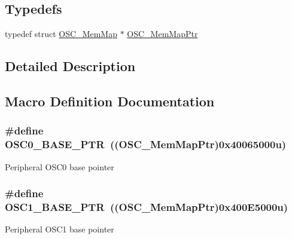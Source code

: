 \subsection*{Typedefs}
\begin{DoxyCompactItemize}
\item 
typedef struct \hyperlink{struct_o_s_c___mem_map}{O\+S\+C\+\_\+\+Mem\+Map} $\ast$ \hyperlink{group___o_s_c___peripheral_gaaa685163f549fdf24c28ec9b400310b5}{O\+S\+C\+\_\+\+Mem\+Map\+Ptr}
\end{DoxyCompactItemize}


\subsection{Detailed Description}


\subsection{Macro Definition Documentation}
\hypertarget{group___o_s_c___peripheral_gaab1618c69a91b2e5d3385139b5b566f0}{}
\subsubsection[{O\+S\+C0\+\_\+\+B\+A\+S\+E\+\_\+\+P\+T\+R}]{\setlength{\rightskip}{0pt plus 5cm}\#define O\+S\+C0\+\_\+\+B\+A\+S\+E\+\_\+\+P\+T\+R~(({\bf O\+S\+C\+\_\+\+Mem\+Map\+Ptr})0x40065000u)}\label{group___o_s_c___peripheral_gaab1618c69a91b2e5d3385139b5b566f0}
Peripheral O\+S\+C0 base pointer \hypertarget{group___o_s_c___peripheral_ga5a0e46e15931232a6e0cafb7315041fa}{}
\subsubsection[{O\+S\+C1\+\_\+\+B\+A\+S\+E\+\_\+\+P\+T\+R}]{\setlength{\rightskip}{0pt plus 5cm}\#define O\+S\+C1\+\_\+\+B\+A\+S\+E\+\_\+\+P\+T\+R~(({\bf O\+S\+C\+\_\+\+Mem\+Map\+Ptr})0x400\+E5000u)}\label{group___o_s_c___peripheral_ga5a0e46e15931232a6e0cafb7315041fa}
Peripheral O\+S\+C1 base pointer \hypertarget{group___o_s_c___peripheral_ga46f69fcb9d660e18b5cbf51adbbcec78}{}
